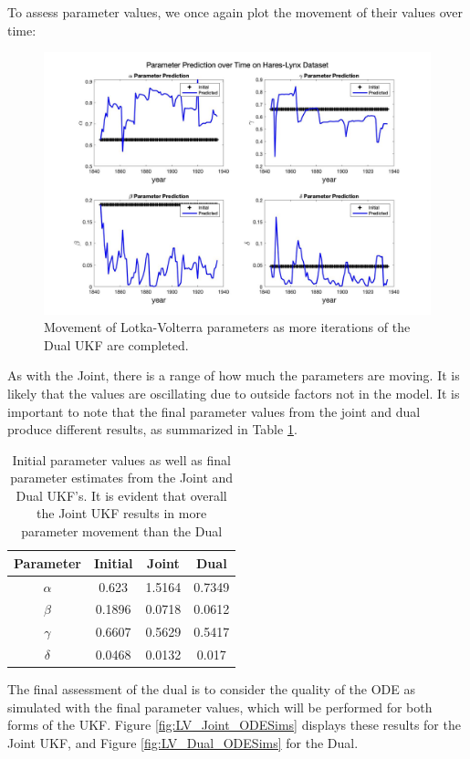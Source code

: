 To assess parameter values, we once again plot the movement of their values over time:
\begin{figure}[H]
    \centering
    \includegraphics[width=15cm]{Kalman_Filter_Images/LV_Dual_ParamsOverTime.jpg}
    \caption{Movement of Lotka-Volterra parameters as more iterations of the Dual UKF are completed.}
    \label{fig:LV_Dual_ParamMovement}
\end{figure}

As with the Joint, there is a range of how much the parameters are moving. It is likely that the values are oscillating due to outside factors not in the model. It is important to note that the final parameter values from the joint and dual produce different results, as summarized in Table \ref{table:LV_ParamValues}.
\begin{table}[H]
  \begin{center}
    \label{tab:table2}
    \begin{tabular}{c|c|c|c} %
      \textbf{Parameter} & \textbf{Initial} & \textbf{Joint} & \textbf{Dual} \\
      \hline
      \textbf{$\alpha$} & 0.623 & 1.5164 & 0.7349\\
      \textbf{$\beta$} & 0.1896 & 0.0718 & 0.0612\\
      \textbf{$\gamma$} & 0.6607 & 0.5629 & 0.5417\\
      \textbf{$\delta$} & 0.0468 & 0.0132 & 0.017
    \end{tabular}
    \caption{Initial parameter values as well as final parameter estimates from the Joint and Dual UKF's. It is evident that overall the Joint UKF results in more parameter movement than the Dual}
    \label{table:LV_ParamValues}
  \end{center}
\end{table}
The final assessment of the dual is to consider the quality of the ODE as simulated with the final parameter values, which will be performed for both forms of the UKF. Figure \ref{fig:LV_Joint_ODESims} displays these results for the Joint UKF, and Figure \ref{fig:LV_Dual_ODESims} for the Dual. 

